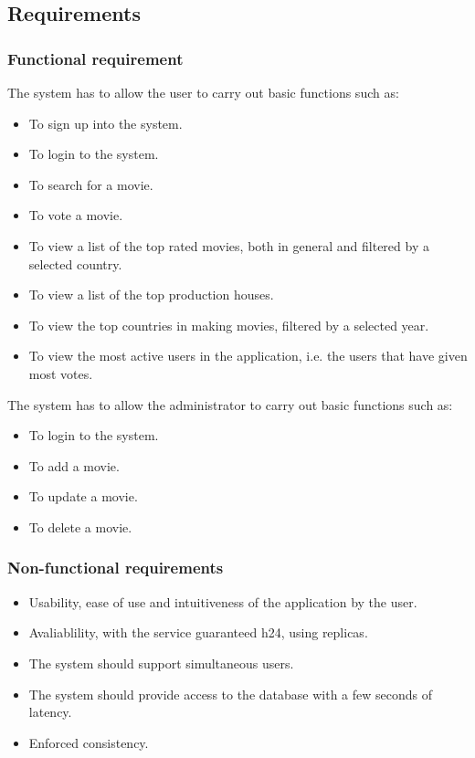 \documentclass[a4paper, oneside]{article}
\begin{document}
\subsection{Requirements}

\subsubsection{Functional requirement}
The system has to allow the user to carry out basic functions such as:
\begin{itemize}
\item To sign up into the system.
\item To login to the system.
\item To search for a movie.
\item To vote a movie.
\item To view a list of the top rated movies, both in general and filtered by a selected country.
\item To view a list of the top production houses.
\item To view the top countries in making movies, filtered by a selected year.
\item To view the most active users in the application, i.e. the users that have given most votes.
\end{itemize}
\vspace{2mm}
The system has to allow the administrator to carry out basic functions such as:
\begin{itemize}
\item To login to the system.
\item To add a movie.
\item To update a movie.
\item To delete a movie.
\end{itemize}
\vspace{2mm}

\subsubsection{Non-functional requirements}
\begin{itemize}
\item Usability, ease of use and intuitiveness of the application by the user.
\item Avaliablility, with the service guaranteed h24, using replicas.
\item The system should support simultaneous users.
\item The system should provide access to the database with a few seconds of latency.
\item Enforced consistency.
\end{itemize}
\end{document}
